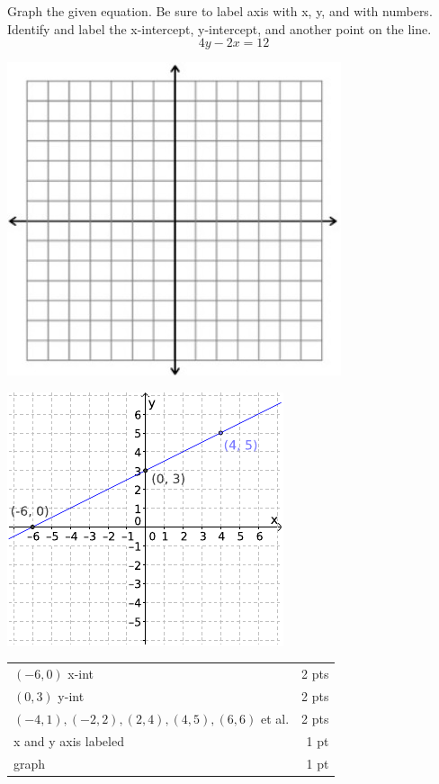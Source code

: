{
	Graph the given equation. Be sure to label axis with x, y, and with numbers. Identify and label the x-intercept, y-intercept, and another point on the line.
	$$4y-2x=12$$
	\begin{onlyproblem}\begin{center}\includegraphics{fig-graphpaper.png}\end{center}\end{onlyproblem}
	\begin{onlysolution}\begin{center}\includegraphics{fig095-09-d-answer}\end{center}\end{onlysolution}
}
{
	\begin{tabular}{l r}
	$(-6,0)$ x-int & 2 pts\\
	$(0,3)$ y-int & 2 pts\\
	$(-4,1),(-2,2),(2,4),(4,5),(6,6)$ et al. & 2 pts\\
	x and y axis labeled & 1 pt\\
	graph & 1 pt\\
	\end{tabular}
}

